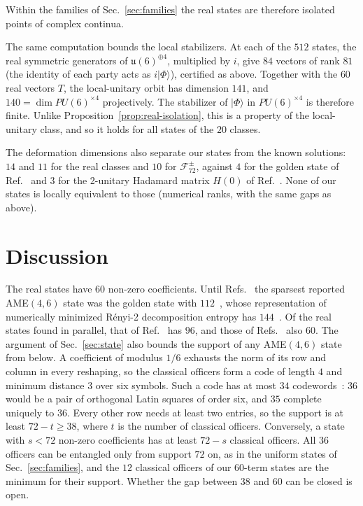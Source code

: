 \documentclass[aps,pra,reprint,superscriptaddress,amsmath,amssymb,longbibliography]{revtex4-2}
\newcommand{\ket}[1]{\lvert #1\rangle}
\theoremstyle{plain}
\begin{document}
Within the families of Sec.~\ref{sec:families} the real states are therefore isolated points of complex continua.

The same computation bounds the local stabilizers.  At each of the $512$ states, the real symmetric generators of
$\mathfrak u(6)^{\oplus4}$, multiplied by $i$, give $84$ vectors of rank $81$ (the identity of each party acts as
$i\ket\Phi$), certified as above.  Together with the $60$ real vectors $T$, the local-unitary orbit has dimension $141$,
and $140=\dim PU(6)^{\times4}$ projectively.  The stabilizer of $\ket\Phi$ in $PU(6)^{\times4}$ is therefore finite.
Unlike Proposition~\ref{prop:real-isolation}, this is a property of the local-unitary class, and so it holds for all
states of the $20$ classes.

The deformation dimensions also separate our states from the known solutions: $14$ and $11$ for the real classes and
$10$ for $\mathcal F_{72}^\pm$, against $4$ for the golden state of Ref.~\cite{RBB22} and $3$ for the 2-unitary Hadamard
matrix $H(0)$ of Ref.~\cite{BZ24}.  None of our states is locally equivalent to those (numerical ranks, with the same gaps as above).

\section{Discussion}\label{sec:discussion}

The real states have $60$ non-zero coefficients.  Until Refs.~\cite{Bru26,Rat26,HZ26} the sparsest
reported AME$(4,6)$ state was the golden state with $112$~\cite{RBB22,RRKL23}, whose representation of numerically minimized R\'enyi-2
decomposition entropy has $144$~\cite{Ram25}.  Of the real states found in parallel, that of Ref.~\cite{HZ26} has
$96$, and those of Refs.~\cite{Bru26,Rat26} also $60$.  The
argument of Sec.~\ref{sec:state} also bounds the support of any AME$(4,6)$ state from below.  A coefficient of modulus
$1/6$ exhausts the norm of its row and column in every reshaping, so the classical officers form a code of length $4$
and minimum distance $3$ over six symbols.  Such a code has at most $34$ codewords~\cite{Parker1975}: $36$ would be a pair of orthogonal
Latin squares of order six, and $35$ complete uniquely to $36$.  Every other row needs at least two entries, so the
support is at least $72-t\ge38$, where $t$ is the number of classical officers.  Conversely, a state with $s<72$ non-zero
coefficients has at least $72-s$ classical officers.  All $36$ officers can be entangled only from support $72$ on, as in the
uniform states of Sec.~\ref{sec:families}, and the $12$ classical officers of our $60$-term states are the minimum for their
support.  Whether the gap between $38$ and $60$ can be closed is open.
\end{document}
